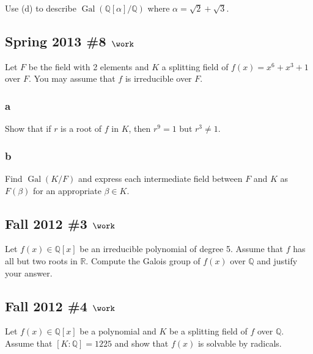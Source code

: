 Use (d) to describe
\(\operatorname{Gal}({\mathbb{Q}}[\alpha]/{\mathbb{Q}})\) where
\(\alpha = \sqrt 2 + \sqrt 3\).

\hypertarget{spring-2013-8-work}{%
\subsection{\texorpdfstring{Spring 2013 \#8
\(\work\)}{Spring 2013 \#8 \textbackslash work}}\label{spring-2013-8-work}}

Let \(F\) be the field with 2 elements and \(K\) a splitting field of
\(f(x) = x^6 + x^3 + 1\) over \(F\). You may assume that \(f\) is
irreducible over \(F\).

\hypertarget{a-81}{%
\subsubsection{a}\label{a-81}}

Show that if \(r\) is a root of \(f\) in \(K\), then \(r^9 = 1\) but
\(r^3\neq 1\).

\hypertarget{b-71}{%
\subsubsection{b}\label{b-71}}

Find \(\operatorname{Gal}(K/F)\) and express each intermediate field
between \(F\) and \(K\) as \(F(\beta)\) for an appropriate
\(\beta \in K\).

\hypertarget{fall-2012-3-work}{%
\subsection{\texorpdfstring{Fall 2012 \#3
\(\work\)}{Fall 2012 \#3 \textbackslash work}}\label{fall-2012-3-work}}

Let \(f(x) \in {\mathbb{Q}}[x]\) be an irreducible polynomial of degree
5. Assume that \(f\) has all but two roots in \({\mathbb{R}}\). Compute
the Galois group of \(f(x)\) over \({\mathbb{Q}}\) and justify your
answer.

\hypertarget{fall-2012-4-work}{%
\subsection{\texorpdfstring{Fall 2012 \#4
\(\work\)}{Fall 2012 \#4 \textbackslash work}}\label{fall-2012-4-work}}

Let \(f(x) \in {\mathbb{Q}}[x]\) be a polynomial and \(K\) be a
splitting field of \(f\) over \({\mathbb{Q}}\). Assume that
\([K:{\mathbb{Q}}] = 1225\) and show that \(f(x)\) is solvable by
radicals.

